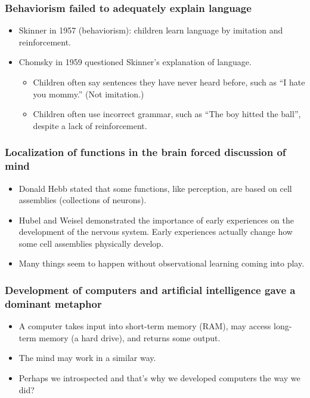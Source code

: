 \documentclass[]{article}
\begin{document}
			\subsubsection{Behaviorism failed to adequately explain language}
				\begin{itemize}
					\item Skinner in 1957 (behaviorism): children learn language by imitation and reinforcement.
					\item Chomsky in 1959 questioned Skinner's explanation of language.
						\begin{itemize}
							\item Children often say sentences they have never heard before, such as ``I hate you mommy.'' (Not imitation.)
							\item Children often use incorrect grammar, such as ``The boy hitted the ball'', despite a lack of reinforcement.
						\end{itemize}
				\end{itemize}
				
			\subsubsection{Localization of functions in the brain forced discussion of mind}
				\begin{itemize}
					\item Donald Hebb stated that some functions, like perception, are based on cell assemblies (collections of neurons).
					\item Hubel and Weisel demonstrated the importance of early experiences on the development of the nervous system. Early experiences actually change how some cell assemblies physically develop.
					\item Many things seem to happen without observational learning coming into play.
				\end{itemize}
				
			\subsubsection{Development of computers and artificial intelligence gave a dominant metaphor}
				\begin{itemize}
					\item A computer takes input into short-term memory (RAM), may access long-term memory (a hard drive), and returns some output.
					\item The mind may work in a similar way.
					\item Perhaps we introspected and that's why we developed computers the way we did?
				\end{itemize}
				
\end{document}
